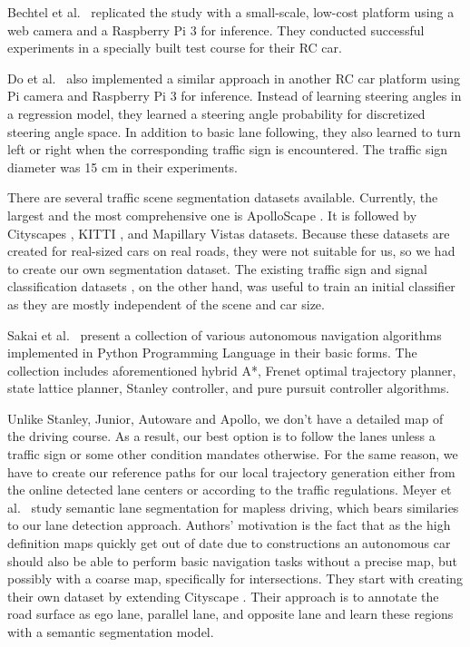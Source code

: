 Bechtel et al.\ \cite{Bechtel2017DeepPicarAL} replicated the study
\cite{Bojarski2016EndTE} with a small-scale, low-cost platform using a web
camera and a Raspberry Pi 3 for inference. They conducted successful
experiments in a specially built test course for their RC car.

Do et al.\ \cite{Do2018RealTimeSC} also implemented a similar approach in
another RC car platform using Pi camera and Raspberry Pi 3 for inference.
Instead of learning steering angles in a regression model, they learned a
steering angle probability for discretized steering angle space. In addition to
basic lane following, they also learned to turn left or right when the
corresponding traffic sign is encountered. The traffic sign diameter was 15 cm
in their experiments.

There are several traffic scene segmentation datasets available. Currently,
the largest and the most comprehensive one is ApolloScape
\cite{Huang2018TheAD}. It is followed by Cityscapes \cite{Cordts2016TheCD},
KITTI \cite{Geiger2012AreWR}, and Mapillary Vistas \cite{Neuhold2017TheMV}
datasets. Because these datasets are created for real-sized cars on real roads,
they were not suitable for us, so we had to create our own segmentation
dataset. The existing traffic sign and signal classification datasets
\cite{Timofte2009MultiviewTS, Stallkamp2012ManVC, Shakhuro2016RussianTS,
Serna2018ClassificationOT, MaldonadoBascn2007RoadSignDA}, on the other hand,
was useful to train an initial classifier as they are mostly independent of the
scene and car size.

Sakai et al.\ \cite{Kim2013SensorbasedMP} present a collection of various
autonomous navigation algorithms implemented in Python Programming Language in
their basic forms. The collection includes aforementioned hybrid A*, Frenet
optimal trajectory planner, state lattice planner, Stanley controller, and pure
pursuit controller algorithms.

Unlike Stanley, Junior, Autoware and Apollo, we don't have a detailed map of
the driving course. As a result, our best option is to follow the lanes unless
a traffic sign or some other condition mandates otherwise. For the same reason,
we have to create our reference paths for our local trajectory generation
either from the online detected lane centers or according to the traffic
regulations. Meyer et al.\ \cite{Meyer2018DeepSL} study semantic lane
segmentation for mapless driving, which bears similaries to our lane detection
approach. Authors' motivation is the fact that as the high definition maps
quickly get out of date due to constructions an autonomous car should also be
able to perform basic navigation tasks without a precise map, but possibly with
a coarse map, specifically for intersections. They start with creating their
own dataset by extending Cityscape \cite{Cordts2016TheCD}. Their approach is to
annotate the road surface as ego lane, parallel lane, and opposite lane and
learn these regions with a semantic segmentation model.

